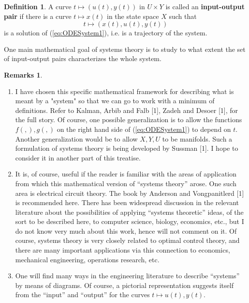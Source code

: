 \documentclass[12pt]{book}
\theoremstyle{plain}
\theoremstyle{definition}
\newtheorem{definition}{Definition}[section]
\newtheorem*{remarks}{Remarks}
\begin{document}
\begin{definition}
    A curve $t \mapsto (u(t), y(t))$ in $U \times Y$ is called an \textbf{input-output pair} if there is a curve $t \mapsto x(t)$ in the state space $X$ such that
    $$t \mapsto (x(t), u(t), y(t))$$
    is a solution of (\ref{eq:ODESystem1}), i.e. is a trajectory of the system.
\end{definition}

One main mathematical goal of systems theory is to study to what extent the set of input-output pairs characterizes the whole system.

\begin{remarks}
\begin{enumerate}
    \item I have chosen this specific mathematical framework for describing what is meant by a "system" so that we can go to work with a minimum of definitions.
    Refer to Kalman, Arbib and Falb [1], Zadeh and Desoer [1], for the full story. %
    Of course, one possible generalization is to allow the functions $f( , ), g( , )$ on the right hand side of (\ref{eq:ODESystem1}) to depend on $t$.
    Another generalization would be to allow $X, Y, U$ to be manifolds.
    Such a formulation of systems theory is being developed by Sussman [1]. %
    I hope to consider it in another part of this treatise.
    \item It is, of course, useful if the reader is familiar with the areas of application from which this mathematical version of ``systems theory'' arose.
    One such area is electrical circuit theory.
    The book by Anderson and Vongpanitlerd [1] is recommended here. %
    There has been widespread discussion in the relevant literature about the possibilities of applying ``systems theoretic'' ideas, of the sort to be described here, to computer science, biology, economics, etc., but I do not know very much about this work, hence will not comment on it.
    Of course, systems theory is very closely related to optimal control theory, and there are many important applications via this connection to economics, mechanical engineering, operations research, etc.
    \item One will find many ways in the engineering literature to describe ``systems'' by means of diagrams.
    Of course, a pictorial representation suggests itself from the ``input'' and ``output'' for the curves $t \mapsto u(t), y(t)$.


\end{enumerate}
\end{remarks}
\end{document}
